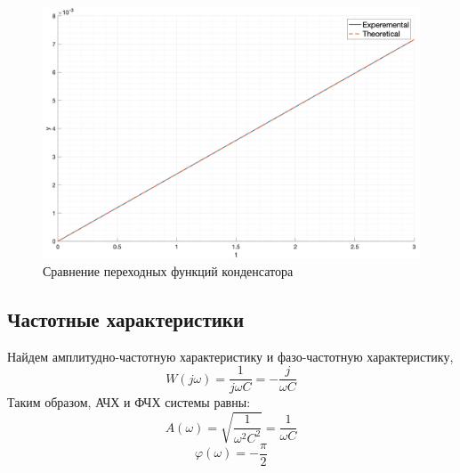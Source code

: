 \begin{figure}[ht!]
    \centering
    \includegraphics[width=\textwidth]{media/plots/task3_step_response_cmp.png}
    \caption{Сравнение переходных функций конденсатора}
    \label{fig:task3_step_response_cmp}
\end{figure}

\FloatBarrier
\subsection{Частотные характеристики}
\noindent Найдем амплитудно-частотную характеристику и фазо-частотную характеристику,
\begin{equation}
    W(j\omega) = \frac{1}{j\omega C} = -\frac{j}{\omega C}
\end{equation}
Таким образом, АЧХ и ФЧХ системы равны:
\begin{equation}
    A(\omega) = \sqrt{\frac{1}{\omega^2C^2}} = \frac{1}{\omega C}
\end{equation}
\begin{equation}
    \varphi(\omega) = -\frac{\pi}{2}
\end{equation}

